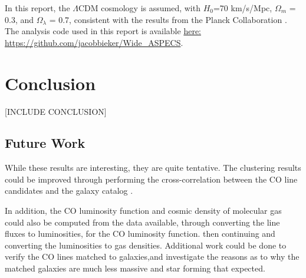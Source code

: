 \documentclass[twoside,single]{lion-msc}
\begin{document}
In this report, the $\Lambda$CDM cosmology is assumed, with $H_0$=70 km/s/Mpc, $\Omega_m$ = 0.3, and $\Omega_{\lambda}$ = 0.7, consistent with the results from the Planck Collaboration \cite{ade2016planck}. The analysis code used in this report is available \href{https://github.com/jacobbieker/Wide\_ASPECS}{here: https://github.com/jacobbieker/Wide\_ASPECS}. 





\chapter{Conclusion}

[INCLUDE CONCLUSION]

\section{Future Work}

While these results are interesting, they are quite tentative. The clustering results could be improved through performing the cross-correlation between the CO line candidates and the galaxy catalog \cite{hickox2011clustering, 10.1111/j.1365-2966.2011.20303.x, 10.1111/j.1365-2966.2008.14071.x}. 

In addition, the CO luminosity function and cosmic density of molecular gas could also be computed from the data available, through converting the line fluxes to luminosities, for the CO luminosity function. then continuing and converting the luminosities to gas densities. Additional work could be done to verify the CO lines matched to galaxies,and investigate the reasons as to why the matched galaxies are much less massive and star forming that expected.

\appendix
%



\end{document}
